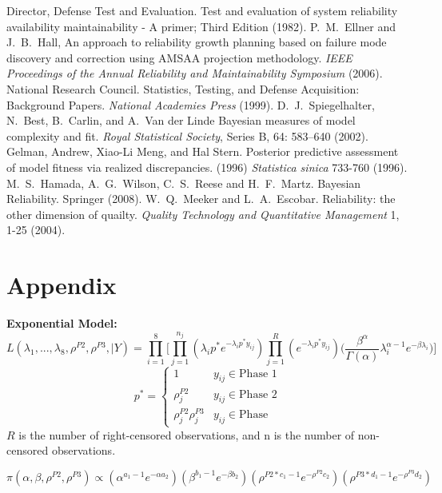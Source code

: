 \documentclass[12pt]{article}
\begin{document}
\begin{thebibliography}{99}
 Director, Defense Test and Evaluation. Test and evaluation of system reliability availability maintainability - A primer; Third Edition (1982).
 P.\ M.\ Ellner and J.\ B.\ Hall, An approach to reliability
growth planning based on failure mode discovery and correction using AMSAA
projection methodology. \textit{IEEE Proceedings of the Annual Reliability and
Maintainability Symposium} (2006).
 National Research Council. Statistics, Testing, and Defense
Acquisition: Background Papers. \textit{National Academies Press} (1999).
 D.\ J.\ Spiegelhalter, N.\ Best, B.\ Carlin, and A.\ Van der
Linde Bayesian measures of model complexity and fit. \textit{Royal Statistical
Society}, Series B, 64: 583–640 (2002).
 Gelman, Andrew, Xiao-Li Meng, and Hal Stern. Posterior
predictive assessment of model fitness via realized discrepancies. (1996)
\textit{Statistica sinica} 733-760 (1996).
 M.\ S.\ Hamada, A.\ G.\ Wilson, C.\ S.\ Reese and H.\ F.\ Martz.
Bayesian Reliability. Springer (2008).
 W.\ Q.\ Meeker and L.\ A.\ Escobar. Reliability: the other
dimension of quailty. \textit{Quality Technology and Quantitative Management} 1,
1-25 (2004).
\end{thebibliography}

\section{Appendix}
\textbf{Exponential Model:}
\begin{equation*}
L(\lambda_1, ..., \lambda_8, \rho^{P2}, \rho^{P3}, \vert Y) = \prod_{i = 1}^8
  \Bigg[\prod_{j = 1}^{n_j}(\lambda_i p^*e^{-\lambda_i p^* y_{ij}})\prod_{j =
  1}^R(e^{-\lambda_i p^*
  y_{ij}})\Big(\frac{\beta^\alpha}{\Gamma(\alpha)}\lambda_i^{\alpha -
  1}e^{-\beta\lambda_i}\Big)\Bigg]
\end{equation*}
\[p^* =   \left\{
\begin{array}{ll}
      1 & y_{ij}\in \text{Phase 1} \\
      \rho_{j}^{P2} & y_{ij} \in \text{Phase 2} \\
      \rho_{j}^{P2} \rho_{j}^{P3} & y_{ij} \in \text{Phase }
\end{array}
\right. \]
$R$ is the number of right-censored observations, and n is the number of
non-censored observations.

\begin{equation*}
\pi(\alpha, \beta, \rho^{P2}, \rho^{P3}) \propto (\alpha^{a_1-1}e^{-\alpha
  a_2})(\beta^{b_1 - 1}e^{-\beta b_2})(\rho^{P2*c_1 - 1}e^{-\rho^{P2}
  c_2})(\rho^{P3*d_1 - 1}e^{-\rho^{P3} d_2})
\end{equation*}
\end{document}
